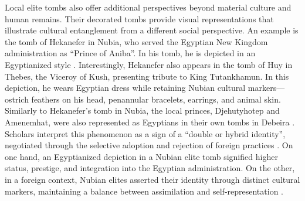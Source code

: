 Local elite tombs also offer additional perspectives beyond material culture and human remains. Their decorated tombs provide visual representations that illustrate cultural entanglement from a different social perspective. An example is the tomb of Hekanefer in Nubia, who served the Egyptian New Kingdom administration as  “Prince of Aniba”. In his tomb, he is depicted in an Egyptianized style \parencite{simpsonHekaneferDynasticMaterial1963}. Interestingly, Hekanefer also appears in the tomb of Huy in Thebes, the Viceroy of Kush, presenting tribute to King Tutankhamun. In this depiction, he wears Egyptian dress while retaining Nubian cultural markers—ostrich feathers on his head, penannular bracelets, earrings, and animal skin. Similarly to Hekanefer’s tomb in Nubia, the local princes, Djehutyhotep and Amenemhat, were also represented as Egyptians in their own tombs in Debeira  \parencites[pl.~XXVII]{davies-gardinerTombHuyViceroy1926}[p.~269-272]{torokTwoWorldsFrontier2009}[p.~536]{vanpeltRevisingEgyptoNubianRelations2013}[p.~5]{lemosForeignObjectsLocal2020}. Scholars interpret this phenomenon as a sign of a “double or hybrid identity”, negotiated through the selective adoption and rejection of foreign practices \parencite{smithHekaneferLowerNubian2015}. On one hand, an Egyptianized depiction in a Nubian elite tomb signified higher status, prestige, and integration into the Egyptian administration. On the other, in a foreign context, Nubian elites asserted their identity through distinct cultural markers, maintaining a balance between assimilation and self-representation \parencites{torokTwoWorldsFrontier2009}{vanpeltRevisingEgyptoNubianRelations2013}.


